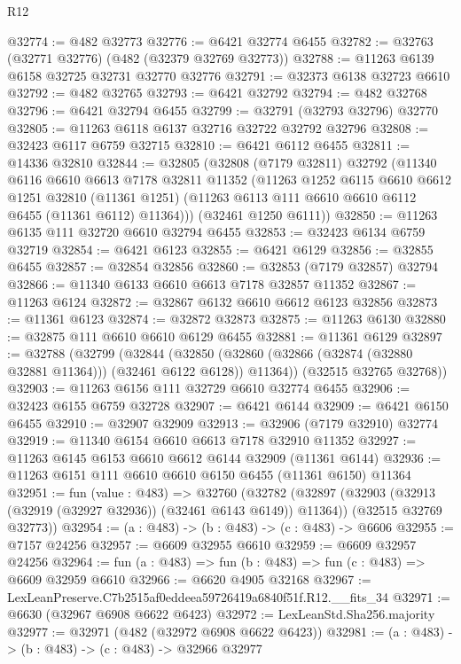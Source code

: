\begin{lexlean}{R12}
\begin{coremodule}
@32774 := @482 @32773
@32776 := @6421 @32774 @6455
@32782 := @32763 (@32771 @32776) (@482 (@32379 @32769 @32773))
@32788 := @11263 @6139 @6158 @32725 @32731 @32770 @32776
@32791 := @32373 @6138 @32723 @6610
@32792 := @482 @32765
@32793 := @6421 @32792
@32794 := @482 @32768
@32796 := @6421 @32794 @6455
@32799 := @32791 (@32793 @32796) @32770
@32805 := @11263 @6118 @6137 @32716 @32722 @32792 @32796
@32808 := @32423 @6117 @6759 @32715
@32810 := @6421 @6112 @6455
@32811 := @14336 @32810
@32844 := @32805
    (@32808
      (@7179 @32811)
      @32792
      (@11340
        @6116
        @6610
        @6613
        @7178
        @32811
        @11352
        (@11263
          @1252
          @6115
          @6610
          @6612
          @1251
          @32810
          (@11361 @1251)
          (@11263 @6113 @111 @6610 @6610 @6112 @6455 (@11361 @6112) @11364)))
      (@32461 @1250 @6111))
@32850 := @11263 @6135 @111 @32720 @6610 @32794 @6455
@32853 := @32423 @6134 @6759 @32719
@32854 := @6421 @6123
@32855 := @6421 @6129
@32856 := @32855 @6455
@32857 := @32854 @32856
@32860 := @32853 (@7179 @32857) @32794
@32866 := @11340 @6133 @6610 @6613 @7178 @32857 @11352
@32867 := @11263 @6124
@32872 := @32867 @6132 @6610 @6612 @6123 @32856
@32873 := @11361 @6123
@32874 := @32872 @32873
@32875 := @11263 @6130
@32880 := @32875 @111 @6610 @6610 @6129 @6455
@32881 := @11361 @6129
@32897 := @32788
    (@32799
      (@32844
        (@32850 (@32860 (@32866 (@32874 (@32880 @32881 @11364))) (@32461 @6122 @6128)) @11364))
      (@32515 @32765 @32768))
@32903 := @11263 @6156 @111 @32729 @6610 @32774 @6455
@32906 := @32423 @6155 @6759 @32728
@32907 := @6421 @6144
@32909 := @6421 @6150 @6455
@32910 := @32907 @32909
@32913 := @32906 (@7179 @32910) @32774
@32919 := @11340 @6154 @6610 @6613 @7178 @32910 @11352
@32927 := @11263 @6145 @6153 @6610 @6612 @6144 @32909 (@11361 @6144)
@32936 := @11263 @6151 @111 @6610 @6610 @6150 @6455 (@11361 @6150) @11364
@32951 := fun (value : @483) =>
  @32760
    (@32782
      (@32897 (@32903 (@32913 (@32919 (@32927 @32936)) (@32461 @6143 @6149)) @11364))
      (@32515 @32769 @32773))
@32954 := (a : @483) -> (b : @483) -> (c : @483) -> @6606
@32955 := @7157 @24256
@32957 := @6609 @32955 @6610
@32959 := @6609 @32957 @24256
@32964 := fun (a : @483) => fun (b : @483) => fun (c : @483) => @6609 @32959 @6610
@32966 := @6620 @4905 @32168
@32967 := LexLeanPreserve.C7b2515af0eddeea59726419a6840f51f.R12.__fits_34
@32971 := @6630 (@32967 @6908 @6622 @6423)
@32972 := LexLeanStd.Sha256.majority
@32977 := @32971 (@482 (@32972 @6908 @6622 @6423))
@32981 := (a : @483) -> (b : @483) -> (c : @483) -> @32966 @32977

\end{coremodule}
\end{lexlean}
